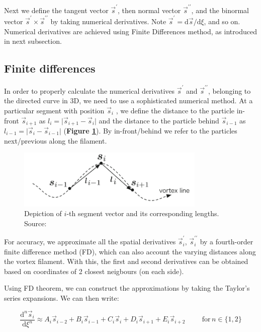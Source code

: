 Next we define the tangent vector $\vec{s}^{\prime}$, then normal vector $\vec{s}^{\prime\prime}$, and the binormal vector $\vec{s}^{\prime} \times \vec{s}^{\prime\prime}$ by taking numerical derivatives. Note $\vec{s}^{\prime} = \text{d}\vec{s} / \text{d}\xi$,
and so on. Numerical derivatives are achieved using Finite Differences method, as introduced in next subsection.


\subsection*{Finite differences}

In order to properly calculate the numerical derivatives $\vec{s}^{\prime}$ and $\vec{s}^{\prime\prime}$, belonging to the directed curve in 3D, we need to use a sophisticated numerical method. At a particular segment with position $\vec{s}_i$ , we define the distance to the particle in-front $\vec{s}_{i+1}$ as $l_{i} = \vert \vec{s}_{i+1} - \vec{s}_i \vert$ and the distance to the particle behind
$\vec{s}_{i-1}$ as $l_{i-1} = \vert \vec{s}_i - \vec{s}_{i-1} \vert$ (\textbf{Figure \ref{FD}}).
By in-front/behind we refer to the particles next/previous along the filament.

\begin{figure}[h]
	\centering
	\includegraphics[width=0.8\textwidth]{graphics/simul/finite-diff}
	\caption{Depiction of $i$-th segment vector and its corresponding lengths. Source: \cite{filament}}
	\label{FD}
\end{figure}

For accuracy, we approximate all the spatial derivatives $\vec{s}_i^{\prime}$, $\vec{s}_i^{\prime\prime}$ by a
fourth-order finite difference method (FD), which can also account the
varying distances along the vortex filament. With this, the first and second derivatives can be obtained based on coordinates of 2 closest neigbours (on each side).

Using FD theorem, we can construct the approximations by taking the Taylor's series expansions. We can then write:

\begin{equation}
\frac{\text{d}^n\vec{s}_i}{\text{d}\xi^n} \approx
A_i\vec{s}_{i-2} +
B_i\vec{s}_{i-1} +
C_i\vec{s}_{i} +
D_i\vec{s}_{i+1} +
E_i\vec{s}_{i+2}
\hspace{1cm}
\text{for} \,n\in\{1,2\}
\label{FDcoeffs}
\end{equation}

